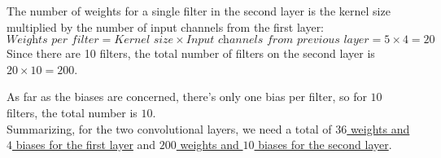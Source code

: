 The number of weights for a single filter in the second layer is the kernel size multiplied by the number of input channels from the first layer:
\[
\textit{Weights per filter} = \textit{Kernel size} \times \textit{Input channels from previous layer} = 5 \times 4=20
\]
Since there are 10 filters, the total number of filters on the second layer is $20 \times 10 = 200$.

As far as the biases are concerned, there's only one bias per filter, so for $10$ filters, the total number is $10$.\\

Summarizing, for the two convolutional layers, we need a total of \underline{$36$ weights and $4$ biases for the first layer} and \underline{$200$ weights and $10$ biases for the second layer}.
\vspace{3mm}